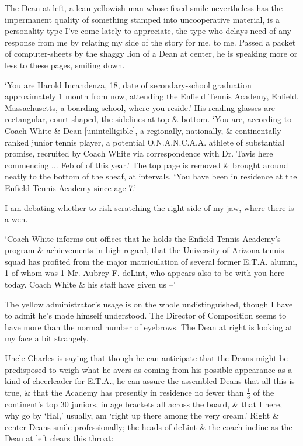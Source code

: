 \documentclass{article}
\numberwithin{equation}{section}
\begin{document}
The Dean at left, a lean yellowish man whose fixed smile nevertheless has the impermanent quality of something stamped into uncooperative material, is a personality-type I've come lately to appreciate, the type who delays need of any response from me by relating my side of the story for me, to me. Passed a packet of computer-sheets by the shaggy lion of a Dean at center, he is speaking more or less to these pages, smiling down.

`You are Harold Incandenza, 18, date of secondary-school graduation approximately 1 month from now, attending the Enfield Tennis Academy, Enfield, Massachusetts, a boarding school, where you reside.' His reading glasses are rectangular, court-shaped, the sidelines at top \& bottom. `You are, according to Coach White \& Dean [unintelligible], a regionally, nationally, \& continentally ranked junior tennis player, a potential O.N.A.N.C.A.A. athlete of substantial promise, recruited by Coach White via correspondence with Dr. Tavis here commencing $\ldots$ Feb of of this year.' The top page is removed \& brought around neatly to the bottom of the sheaf, at intervals. `You have been in residence at the Enfield Tennis Academy since age 7.'

I am debating whether to risk scratching the right side of my jaw, where there is a wen.

`Coach White informs out offices that he holds the Enfield Tennis Academy's program \& achievements in high regard, that the University of Arizona tennis squad has profited from the major matriculation of several former E.T.A. alumni, 1 of whom was 1 Mr. Aubrey F. deLint, who appears also to be with you here today. Coach White \& his staff have given us --'

The yellow administrator's usage is on the whole undistinguished, though I have to admit he's made himself understood. The Director of Composition seems to have more than the normal number of eyebrows. The Dean at right is looking at my face a bit strangely.

Uncle Charles is saying that though he can anticipate that the Deans might be predisposed to weigh what he avers as coming from his possible appearance as a kind of cheerleader for E.T.A., he can assure the assembled Deans that all this is true, \& that the Academy has presently in residence no fewer than $\frac{1}{3}$ of the continent's top 30 juniors, in age brackets all across the board, \& that I here, why go by `Hal,' usually, am `right up there among the very cream.' Right \& center Deans smile professionally; the heads of deLint \& the coach incline as the Dean at left clears this throat:
\end{document}
